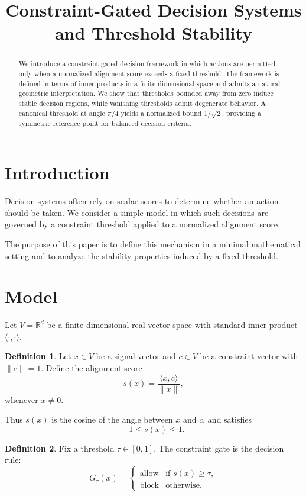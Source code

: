 \documentclass[11pt]{article}
\title{Constraint-Gated Decision Systems and Threshold Stability}
\author{}
\date{}
\theoremstyle{plain}
\theoremstyle{definition}
\newtheorem{definition}{Definition}
\begin{document}
\maketitle

\begin{abstract}
We introduce a constraint-gated decision framework in which actions are permitted only when a normalized alignment score exceeds a fixed threshold. The framework is defined in terms of inner products in a finite-dimensional space and admits a natural geometric interpretation. We show that thresholds bounded away from zero induce stable decision regions, while vanishing thresholds admit degenerate behavior. A canonical threshold at angle $\pi/4$ yields a normalized bound $1/\sqrt{2}$, providing a symmetric reference point for balanced decision criteria.
\end{abstract}

\section{Introduction}

Decision systems often rely on scalar scores to determine whether an action should be taken. We consider a simple model in which such decisions are governed by a constraint threshold applied to a normalized alignment score.

The purpose of this paper is to define this mechanism in a minimal mathematical setting and to analyze the stability properties induced by a fixed threshold.

\section{Model}

Let $V = \mathbb{R}^d$ be a finite-dimensional real vector space with standard inner product $\langle \cdot, \cdot \rangle$.

\begin{definition}
Let $x \in V$ be a signal vector and $c \in V$ be a constraint vector with $\|c\| = 1$. Define the alignment score
\[
s(x) = \frac{\langle x, c \rangle}{\|x\|},
\]
whenever $x \neq 0$.
\end{definition}

Thus $s(x)$ is the cosine of the angle between $x$ and $c$, and satisfies
\[
-1 \le s(x) \le 1.
\]

\begin{definition}
Fix a threshold $\tau \in [0,1]$. The constraint gate is the decision rule:
\[
G_\tau(x) =
\begin{cases}
\text{allow} & \text{if } s(x) \ge \tau, \\
\text{block} & \text{otherwise}.
\end{cases}
\]
\end{definition}
\end{document}
